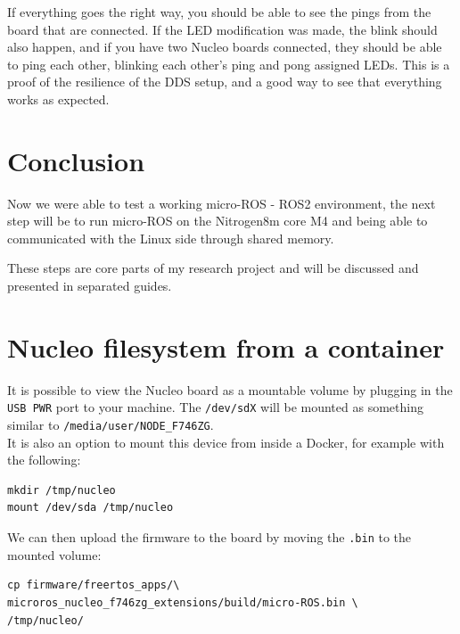 \documentclass[10pt]{article}
\begin{document}
If everything goes the right way, you should be able to see the pings from the board that are connected. If the LED modification was made, the blink should also happen, and if you have two Nucleo boards connected, they should be able to ping each other, blinking each other's ping and pong assigned LEDs. This is a proof of the resilience of the DDS setup, and a good way to see that everything works as expected.

\section{Conclusion}
\label{sec:conclusion}
Now we were able to test a working micro-ROS - ROS2 environment, the next step will be to run micro-ROS on the Nitrogen8m core M4 and being able to communicated with the Linux side through shared memory.

These steps are core parts of my research project and will be discussed and presented in separated guides.


\pagebreak
\appendix
\section{Nucleo filesystem from a container}
\label{appendix:nucl-filesyst-from}
It is possible to view the Nucleo board as a mountable volume by plugging in the \verb|USB PWR| port to your machine. The \verb|/dev/sdX| will be mounted as something similar to \verb|/media/user/NODE_F746ZG|.\\
It is also an option to mount this device from inside a Docker, for example with the following:
\begin{tcolorbox}
\begin{verbatim}
mkdir /tmp/nucleo
mount /dev/sda /tmp/nucleo
\end{verbatim}
\end{tcolorbox}

We can then upload the firmware to the board by moving the \verb|.bin| to the mounted volume:
\begin{tcolorbox}
\begin{verbatim}
cp firmware/freertos_apps/\
microros_nucleo_f746zg_extensions/build/micro-ROS.bin \
/tmp/nucleo/
\end{verbatim}
\end{tcolorbox}
\end{document}
